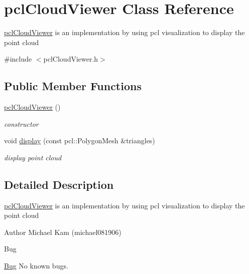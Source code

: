 \hypertarget{classpclCloudViewer}{}\section{pcl\+Cloud\+Viewer Class Reference}
\label{classpclCloudViewer}


\hyperlink{classpclCloudViewer}{pcl\+Cloud\+Viewer} is an implementation by using pcl visualization to display the point cloud
\begin{DoxyItemize}
\item 
\end{DoxyItemize} 




{\ttfamily \#include $<$pcl\+Cloud\+Viewer.\+h$>$}

\subsection*{Public Member Functions}
\begin{DoxyCompactItemize}
\item 
\hyperlink{classpclCloudViewer_a42c5df5bd52456d9c0b9991f6518de25}{pcl\+Cloud\+Viewer} ()\hypertarget{classpclCloudViewer_a42c5df5bd52456d9c0b9991f6518de25}{}\label{classpclCloudViewer_a42c5df5bd52456d9c0b9991f6518de25}

\begin{DoxyCompactList}\small\item\em constructor \end{DoxyCompactList}\item 
void \hyperlink{classpclCloudViewer_ac2d8694c2f060c9e2ec142e459d20114}{display} (const pcl\+::\+Polygon\+Mesh \&triangles)
\begin{DoxyCompactList}\small\item\em display point cloud \end{DoxyCompactList}\end{DoxyCompactItemize}


\subsection{Detailed Description}
\hyperlink{classpclCloudViewer}{pcl\+Cloud\+Viewer} is an implementation by using pcl visualization to display the point cloud
\begin{DoxyItemize}
\item 
\end{DoxyItemize}

\begin{DoxyAuthor}{Author}
Michael Kam (michael081906) 
\end{DoxyAuthor}
\begin{DoxyRefDesc}{Bug}
\item[\hyperlink{bug__bug000010}{Bug}]No known bugs. \end{DoxyRefDesc}


